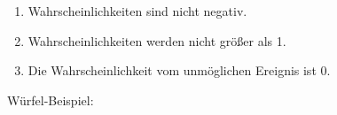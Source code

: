 \begin{enumerate}
    \item Wahrscheinlichkeiten sind nicht negativ.
    \item Wahrscheinlichkeiten werden nicht größer als 1.
    \item Die Wahrscheinlichkeit vom unmöglichen Ereignis ist 0.
\end{enumerate}

Würfel-Beispiel:



